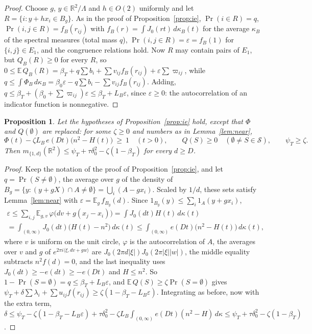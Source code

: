 \documentclass[11pt,a4paper]{amsart}
\newtheorem{proposition}[theorem]{Proposition}
\theoremstyle{definition}
\theoremstyle{remark}
\newcommand{\R}{\mathbb{R}}
\begin{document}
\begin{proof}
Choose $g$, $y\in\R^2/\Lambda$ and $h\in O(2)$ uniformly and let $R=\{i:y+hx_i\in B_g\}$. As in the proof of
Proposition~\ref{prop:ie}, $\Pr(i\in R)=q$, $\Pr(i,j\in R)=f_B(r_{ij})$ with $f_B(r)=\int J_0(rt)\,d\kappa_B(t)$ for
the average $\kappa_B$ of the spectral measures (total mass $q$), $\Pr(i,j\in R)=\varepsilon=f_B(1)$ for
$\{i,j\}\in E_1$, and the congruence relations hold. Now $R$ may contain pairs of $E_1$, but $Q_B(R)\ge0$ for every
$R$, so $0\le\mathbb E\,Q_B(R)=\beta_T+q\sum b_i+\sum v_{ij}f_B(r_{ij})+\varepsilon\sum\varpi_{ij}$, while
$q\le\int\Phi_B\,d\kappa_B=\beta_0\varepsilon-q\sum b_i-\sum v_{ij}f_B(r_{ij})$. Adding,
$q\le\beta_T+(\beta_0+\sum\varpi_{ij})\varepsilon\le\beta_T+L_B\varepsilon$, since $\varepsilon\ge0$: the
autocorrelation of an indicator function is nonnegative.
\end{proof}

\begin{proposition}\label{prop:hit}
Let the hypotheses of Proposition~\ref{prop:ie} hold, except that $\Phi$ and $Q(\emptyset)$ are replaced: for some
$\zeta\ge0$ and numbers as in Lemma~\ref{lem:near},
\[
\Phi(t)-\zeta L_B\,e(Dt)\bigl(n^2-H(t)\bigr)\ \ge\ 1\quad(t>0),\qquad Q(S)\ge0\quad(\emptyset\ne S\in\mathcal S),
\qquad\psi_T\ge\zeta.
\]
Then $m_{\{1,d\}}(\R^2)\le\psi_T+\tau\delta_0^2-\zeta(1-\beta_T)$ for every $d\ge D$.
\end{proposition}

\begin{proof}
Keep the notation of the proof of Proposition~\ref{prop:ie}, and let $q=\Pr(S\ne\emptyset)$, the average over $g$ of
the density of $B_g=\{y:(y+gX)\cap A\ne\emptyset\}=\bigcup_i(A-gx_i)$. Scaled by $1/d$, these sets satisfy
Lemma~\ref{lem:near} with $\varepsilon=\mathbb E_g\,f_{B_g}(d)$. Since $1_{B_g}(y)\le\sum_i1_A(y+gx_i)$,
\begin{multline*}
\varepsilon\le\sum_{i,j}\mathbb E_{g,v}\,\varphi\bigl(dv+g(x_j-x_i)\bigr)=\int J_0(dt)H(t)\,d\kappa(t)\\
=\int_{(0,\infty)}J_0(dt)\bigl(H(t)-n^2\bigr)\,d\kappa(t)\le\int_{(0,\infty)}e(Dt)\bigl(n^2-H(t)\bigr)\,d\kappa(t),
\end{multline*}
where $v$ is uniform on the unit circle, $\varphi$ is the autocorrelation of $A$, the averages over $v$ and $g$ of
$e^{2\pi i\langle\xi,dv+gw\rangle}$ are $J_0(2\pi d|\xi|)J_0(2\pi|\xi||w|)$, the middle equality subtracts
$n^2f(d)=0$, and the last inequality uses $J_0(dt)\ge-e(dt)\ge-e(Dt)$ and $H\le n^2$. So $1-\Pr(S=\emptyset)=q\le\beta_T+L_B\varepsilon$, and $\mathbb E\,Q(S)\ge\zeta\Pr(S=\emptyset)$ gives
$\psi_T+\delta\sum\lambda_i+\sum u_{ij}f(r_{ij})\ge\zeta(1-\beta_T-L_B\varepsilon)$. Integrating as before, now with
the extra term, $\delta\le\psi_T-\zeta(1-\beta_T-L_B\varepsilon)+\tau\delta_0^2-\zeta L_B\int_{(0,\infty)}e(Dt)(n^2-H)
\,d\kappa\le\psi_T+\tau\delta_0^2-\zeta(1-\beta_T)$.
\end{proof}
\end{document}
